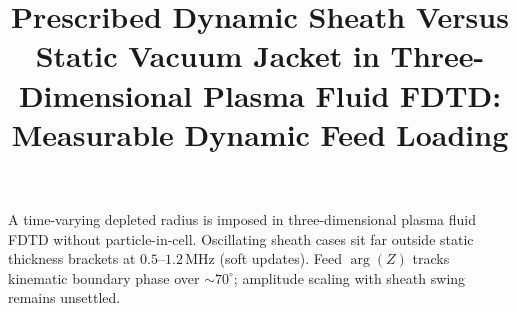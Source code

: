 \documentclass[draft]{agujournal2025}
\begin{document}

\title{Prescribed Dynamic Sheath Versus Static Vacuum Jacket in Three-Dimensional Plasma Fluid FDTD: Measurable Dynamic Feed Loading}





\keypoints%
{A time-varying depleted radius is imposed in three-dimensional plasma fluid FDTD without particle-in-cell.}%
{Oscillating sheath cases sit far outside static thickness brackets at \(0.5\)--\(1.2\,\mathrm{MHz}\) (soft updates).}%
{Feed \(\arg(Z)\) tracks kinematic boundary phase over \(\sim 70^\circ\); amplitude scaling with sheath swing remains unsettled.}
\end{document}
